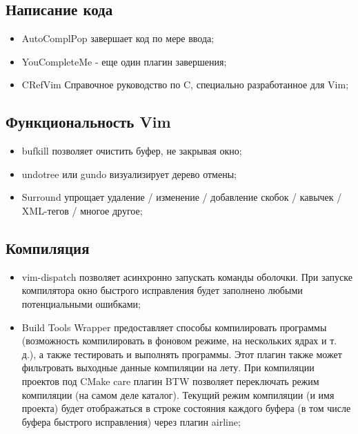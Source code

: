 \subsection{Написание кода}
\begin{itemize}
    \item AutoComplPop завершает код по мере ввода;\\
    \item YouCompleteMe - еще один плагин завершения;\\
    \item CRefVim Справочное руководство по C, специально разработанное для Vim;\\
\end{itemize}

\subsection{Функциональность Vim}
\begin{itemize}
    \item bufkill позволяет очистить буфер, не закрывая окно;\\
    \item undotree или gundo визуализирует дерево отмены;\\
    \item Surround упрощает удаление / изменение / добавление скобок / кавычек / XML-тегов / 
        многое другое;\\
\end{itemize}

\subsection{Компиляция}
\begin{itemize}
    \item vim-dispatch позволяет асинхронно запускать команды оболочки. При запуске компилятора 
        окно быстрого исправления будет заполнено любыми потенциальными ошибками;\\
    \item Build Tools Wrapper предоставляет способы компилировать программы (возможность 
        компилировать в фоновом режиме, на нескольких ядрах и т. д.), а также тестировать и 
        выполнять программы. Этот плагин также может фильтровать выходные данные компиляции на 
        лету. При компиляции проектов под CMake care плагин BTW позволяет переключать режим 
        компиляции (на самом деле каталог). Текущий режим компиляции (и имя проекта) будет 
        отображаться в строке состояния каждого буфера (в том числе буфера быстрого исправления) 
        через плагин airline;\\
\end{itemize}

